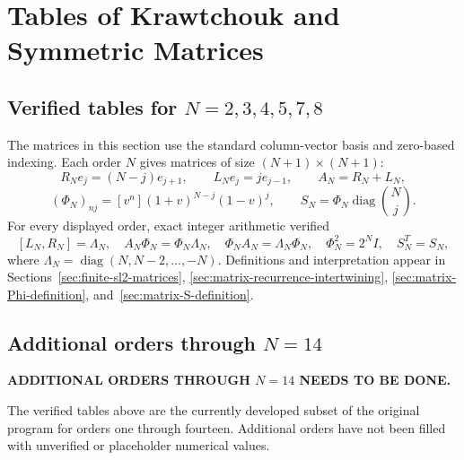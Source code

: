 \chapter{Tables of Krawtchouk and Symmetric Matrices}
\label{app:matrix-tables}
\section{Verified tables for $N=2,3,4,5,7,8$}
The matrices in this section use the standard column-vector basis
and zero-based indexing. Each order $N$ gives matrices of size
$(N+1)\times(N+1)$:
\[
R_Ne_j=(N-j)e_{j+1},\qquad L_Ne_j=je_{j-1},\qquad A_N=R_N+L_N,
\]
\[
(\Phi_N)_{nj}=[v^n](1+v)^{N-j}(1-v)^j,\qquad
S_N=\Phi_N\operatorname{diag}\binom Nj.
\]
For every displayed order, exact integer arithmetic verified
\[
[L_N,R_N]=\Lambda_N,\quad
A_N\Phi_N=\Phi_N\Lambda_N,\quad
\Phi_NA_N=\Lambda_N\Phi_N,\quad
\Phi_N^2=2^NI,\quad S_N^T=S_N,
\]
where $\Lambda_N=\operatorname{diag}(N,N-2,\ldots,-N)$.
Definitions and interpretation appear in
Sections~\ref{sec:finite-sl2-matrices},
\ref{sec:matrix-recurrence-intertwining},
\ref{sec:matrix-Phi-definition}, and~\ref{sec:matrix-S-definition}.








\section{Additional orders through $N=14$}

\noindent\textbf{ADDITIONAL ORDERS THROUGH $N=14$ NEEDS TO BE DONE.}

The verified tables above are the currently developed subset of the
original program for orders one through fourteen. Additional orders
have not been filled with unverified or placeholder numerical values.
